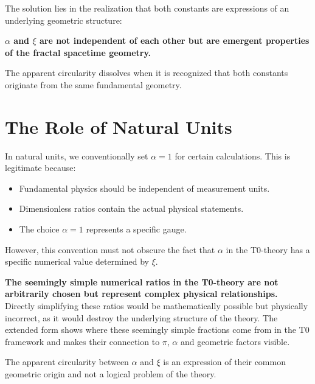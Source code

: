 	The solution lies in the realization that both constants are expressions of an underlying geometric structure:
	
	\begin{tcolorbox}[colback=green!5!white,colframe=green!75!black]
		\textbf{\(\alpha\) and \(\xi\) are not independent of each other but are emergent properties of the fractal spacetime geometry.}
	\end{tcolorbox}
	
	The apparent circularity dissolves when it is recognized that both constants originate from the same fundamental geometry.
	
	\section{The Role of Natural Units}
	\label{sec:units}
	
	In natural units, we conventionally set \(\alpha = 1\) for certain calculations. This is legitimate because:
	
	\begin{itemize}
		\item Fundamental physics should be independent of measurement units.
		\item Dimensionless ratios contain the actual physical statements.
		\item The choice \(\alpha = 1\) represents a specific gauge.
	\end{itemize}
	
	However, this convention must not obscure the fact that \(\alpha\) in the T0-theory has a specific numerical value determined by \(\xi\).
	
	\begin{tcolorbox}[colback=blue!5!white,colframe=blue!75!black]
		\textbf{The seemingly simple numerical ratios in the T0-theory are not arbitrarily chosen but represent complex physical relationships.} \\
		
		Directly simplifying these ratios would be mathematically possible but physically incorrect, as it would destroy the underlying structure of the theory. The extended form shows where these seemingly simple fractions come from in the T0 framework and makes their connection to \(\pi\), \(\alpha\) and geometric factors visible.
		
		The apparent circularity between \(\alpha\) and \(\xi\) is an expression of their common geometric origin and not a logical problem of the theory.
	\end{tcolorbox}

